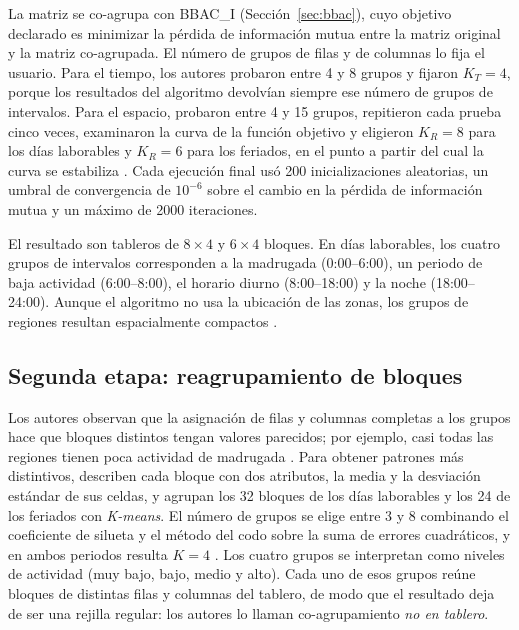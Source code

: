 La matriz se co-agrupa con BBAC\_I (Sección~\ref{sec:bbac}), cuyo objetivo
declarado es minimizar la pérdida de información mutua entre la matriz original y
la matriz co-agrupada. El número de grupos de filas y de columnas lo fija el
usuario. Para el tiempo, los autores probaron entre 4 y 8 grupos y fijaron
$K_T = 4$, porque los resultados del algoritmo devolvían siempre ese número de
grupos de intervalos.
Para el espacio, probaron entre 4 y 15 grupos, repitieron cada prueba cinco veces,
examinaron la curva de la función objetivo y eligieron $K_R = 8$ para los días
laborables y $K_R = 6$ para los feriados, en el punto a partir del cual la curva
se estabiliza \cite[Sec.~IV.B]{Liu2021}. Cada ejecución final usó 200
inicializaciones aleatorias, un umbral de convergencia de $10^{-6}$ sobre el
cambio en la pérdida de información mutua y un máximo de 2000 iteraciones.

El resultado son tableros de $8 \times 4$ y $6 \times 4$ bloques. En días
laborables, los cuatro grupos de intervalos corresponden a la madrugada
(0:00--6:00), un periodo de baja actividad (6:00--8:00), el horario diurno
(8:00--18:00) y la noche (18:00--24:00). Aunque el algoritmo no usa la ubicación de
las zonas, los grupos de regiones resultan espacialmente compactos
\cite[Sec.~IV.C]{Liu2021}.

\subsection{Segunda etapa: reagrupamiento de bloques}

Los autores observan que la asignación de filas y columnas completas a los grupos
hace que bloques distintos tengan valores parecidos; por ejemplo, casi todas las
regiones tienen poca actividad de madrugada \cite[Sec.~III.B]{Liu2021}. Para
obtener patrones más distintivos, describen cada bloque con dos atributos, la
media y la desviación estándar de sus celdas, y agrupan los 32 bloques de los
días laborables y los 24 de los feriados con \textit{K-means}. El número de
grupos se elige entre 3 y 8 combinando el coeficiente de silueta y el método del
codo sobre la suma de errores cuadráticos, y en ambos periodos resulta $K = 4$
\cite[Sec.~IV.D]{Liu2021}. Los cuatro grupos se interpretan como niveles de
actividad (muy bajo, bajo, medio y alto). Cada uno de esos grupos reúne bloques
de distintas filas y columnas del tablero, de modo que el resultado deja de ser
una rejilla regular: los autores lo llaman co-agrupamiento \emph{no en tablero}.

